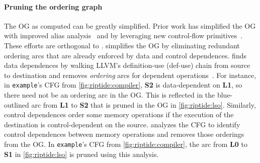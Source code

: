 \paragraph{Pruning the ordering graph} 
The OG as computed can be greatly simplified.
% 
Prior work has simplified the OG with improved alias analysis~\cite{hind-aa} and by leveraging new control-flow primitives~\cite{midkiff-padua,doacross}.
% 
These efforts are orthogonal to \riptide.
% 
\riptide simplifies the OG by eliminating redundant
ordering arcs that are already enforced by data and control dependences.
%
% 
\riptide finds data dependences by walking LLVM's definition-use (def-use)
chain from source to destination and removes \emph{ordering} arcs for dependent operations~\cite{nachos}.
%
For instance, in \texttt{example}'s CFG from \autoref{fig:riptide:compiler}, 
\textbf{S2} is data-dependent on \textbf{L1}, so there need not
be an ordering arc in the OG. This is reflected in the blue-outlined arc
from \textbf{L1} to \textbf{S2} that is pruned in the OG in \autoref{fig:riptide:lso}.
%
Similarly, control dependences order some memory operations if the execution of
the destination is control-dependent on the source.
%
%
\riptide analyzes the CFG to identify control dependences
between memory operations and removes those orderings from the OG.
%
In \texttt{example}'s CFG from \autoref{fig:riptide:compiler}, the
arc from \textbf{L0} to \textbf{S1} in \autoref{fig:riptide:lso} is pruned using this analysis.

\figRipTideLSO

